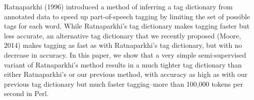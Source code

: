 Ratnaparkhi (1996) introduced a method of inferring a tag dictionary from annotated data to speed up part-of-speech tagging by limiting the set of possible tags for each word. While Ratnaparkhi's tag dictionary makes tagging faster but less accurate, an alternative tag dictionary that we recently proposed (Moore, 2014) makes tagging as fast as with Ratnaparkhi's tag dictionary, but with no decrease in accuracy. In this paper, we show that a very simple semi-supervised variant of Ratnaparkhi's method results in a much tighter tag dictionary than either Ratnaparkhi's or our previous method, with accuracy as high as with our previous tag dictionary but much faster tagging--more than 100,000 tokens per second in Perl.
